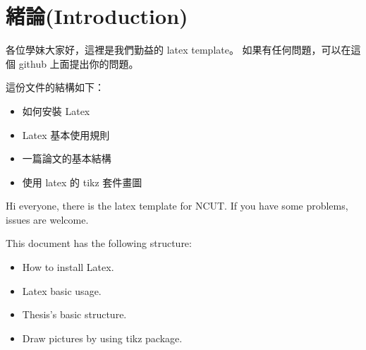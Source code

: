 \section{緒論(Introduction)}

各位學妹大家好，這裡是我們勤益的 latex template。
如果有任何問題，可以在這個 github 上面提出你的問題。

這份文件的結構如下：
\begin{itemize}
	\item 如何安裝 Latex
	\item Latex 基本使用規則
	\item 一篇論文的基本結構
	\item 使用 latex 的 tikz 套件畫圖
\end{itemize}

Hi everyone, there is the latex template for NCUT.
If you have some problems, issues are welcome.

This document has the following structure:
\begin{itemize}
	\item How to install Latex.
	\item Latex basic usage.
	\item Thesis's basic structure.
	\item Draw pictures by using tikz package.
\end{itemize}
